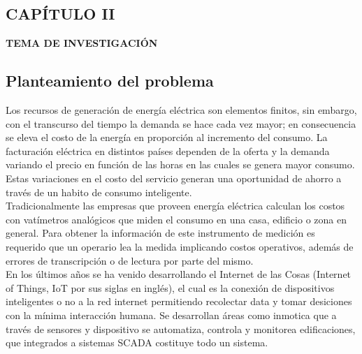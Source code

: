 \begin{center}
    \setcounter{section}{2}
    \section*{CAPÍTULO II}
    \vspace*{0.5in}
    \textbf{TEMA DE INVESTIGACIÓN}
\end{center}

\subsection{Planteamiento del problema}

    Los recursos de generación de energía eléctrica son elementos finitos, sin embargo,  con el transcurso del tiempo la demanda se 
    hace cada vez mayor; en consecuencia se eleva el costo de la energía en proporción al incremento del consumo. La facturación eléctrica
    en distintos países dependen de la oferta y la demanda variando el precio
    en función de las horas en las cuales se genera mayor consumo. Estas variaciones en el costo del servicio generan una 
    oportunidad de ahorro a través de un habito de consumo inteligente.\\
    
    Tradicionalmente las empresas que proveen energía eléctrica calculan los costos con vatímetros analógicos que miden el 
    consumo en una casa, edificio o zona en general. Para obtener la información de este instrumento de medición es 
    requerido que un operario lea la medida implicando costos operativos, además de errores de transcripción o de lectura
    por parte del mismo.\\

    En los últimos años se ha venido desarrollando el Internet de las Cosas (Internet of Things, IoT por sus siglas en inglés),
    el cual es la conexión de dispositivos inteligentes o no a la red internet permitiendo recolectar data y tomar desiciones 
    con la mínima interacción humana. Se desarrollan áreas como inmotica que a través de sensores y dispositivo se automatiza, controla
    y monitorea edificaciones, que integrados a sistemas SCADA costituye todo un sistema.\\

    

